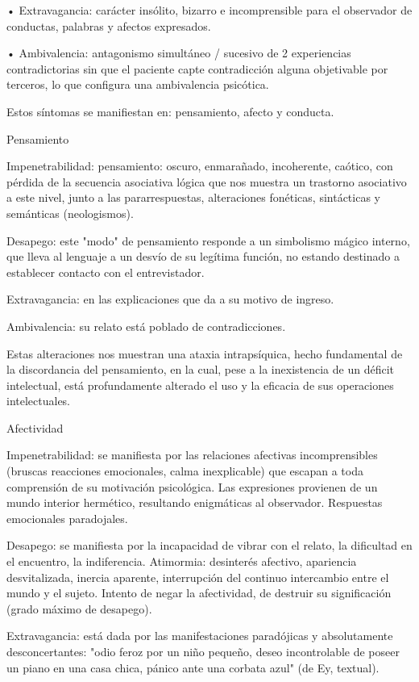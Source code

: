 • Extravagancia: carácter insólito, bizarro e incomprensible para el observador de conductas, palabras y afectos expresados.

• Ambivalencia: antagonismo simultáneo / sucesivo de 2 experiencias contradictorias sin que el paciente capte contradicción alguna objetivable por terceros, lo que configura una ambivalencia psicótica.

Estos síntomas se manifiestan en: pensamiento, afecto y conducta.

Pensamiento

Impenetrabilidad: pensamiento: oscuro, enmarañado, incoherente, caótico, con pérdida de la secuencia asociativa lógica que nos muestra un trastorno asociativo a este nivel, junto a las pararrespuestas, alteraciones fonéticas, sintácticas y semánticas (neologismos).

Desapego: este "modo" de pensamiento responde a un simbolismo mágico interno, que lleva al lenguaje a un desvío de su legítima función, no estando destinado a establecer contacto con el entrevistador.

Extravagancia: en las explicaciones que da a su motivo de ingreso.

Ambivalencia: su relato está poblado de contradicciones.

Estas alteraciones nos muestran una ataxia intrapsíquica, hecho fundamental de la discordancia del pensamiento, en la cual, pese a la inexistencia de un déficit intelectual, está profundamente alterado el uso y la eficacia de sus operaciones intelectuales.

Afectividad

Impenetrabilidad: se manifiesta por las relaciones afectivas incomprensibles (bruscas reacciones emocionales, calma inexplicable) que escapan a toda comprensión de su motivación psicológica. Las expresiones provienen de un mundo interior hermético, resultando enigmáticas al observador. Respuestas emocionales paradojales.

Desapego: se manifiesta por la incapacidad de vibrar con el relato, la dificultad en el encuentro, la indiferencia. Atimormia: desinterés afectivo, apariencia desvitalizada, inercia aparente, interrupción del continuo intercambio entre el mundo y el sujeto. Intento de negar la afectividad, de destruir su significación (grado máximo de desapego).

Extravagancia: está dada por las manifestaciones paradójicas y absolutamente desconcertantes: "odio feroz por un niño pequeño, deseo incontrolable de poseer un piano en una casa chica, pánico ante una corbata azul" (de Ey, textual).

